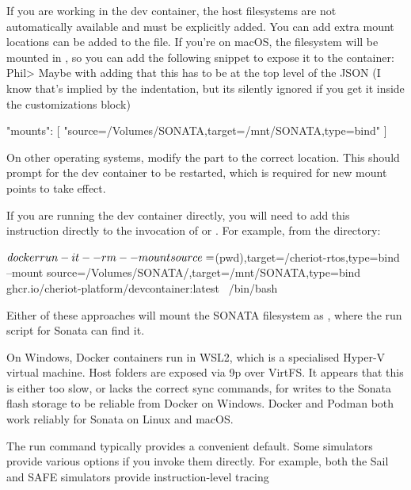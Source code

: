 If you are working in the dev container, the host filesystems are not automatically available and must be explicitly added.
You can add extra mount locations can be added to the  file.
If you're on macOS, the  filesystem will be mounted in , so you can add the following snippet to expose it to the container:
Phil> Maybe with adding that this has to be at the top level of the JSON (I know that's implied by the indentation, but its silently ignored if you get it inside the customizations block)
\begin{jsonsnippet}
  "mounts": [
    "source=/Volumes/SONATA,target=/mnt/SONATA,type=bind"
  ]
\end{jsonsnippet}

On other operating systems, modify the  part to the correct location.
This should prompt for the dev container to be restarted, which is required for new mount points to take effect.

If you are running the dev container directly, you will need to add this instruction directly to the invocation of  or .
For example, from the  directory:

\begin{console}
$ docker run -it --rm \\
	--mount source=$(pwd),target=/cheriot-rtos,type=bind \\
	--mount source=/Volumes/SONATA/,target=/mnt/SONATA,type=bind \\
	ghcr.io/cheriot-platform/devcontainer:latest \
	/bin/bash
\end{console}

Either of these approaches will mount the SONATA filesystem as , where the run script for Sonata can find it.

\begin{caution}
	On Windows, Docker containers run in WSL2, which is a specialised Hyper-V virtual machine.
	Host folders are exposed via 9p over VirtFS.
	It appears that this is either too slow, or lacks the correct sync commands, for writes to the Sonata flash storage to be reliable from Docker on Windows.
	Docker and Podman both work reliably for Sonata on Linux and macOS.
\end{caution}

The run command typically provides a convenient default.
Some simulators provide various options if you invoke them directly.
For example, both the Sail and SAFE simulators provide instruction-level tracing

